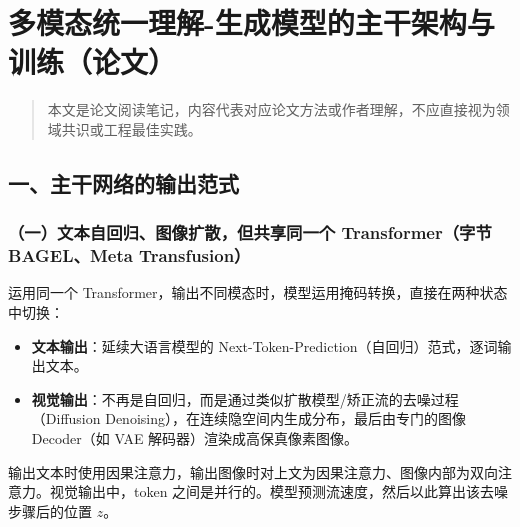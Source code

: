 \clearpage

\hypertarget{ux591aux6a21ux6001ux7edfux4e00ux7406ux89e3-ux751fux6210ux6a21ux578bux7684ux4e3bux5e72ux67b6ux6784ux4e0eux8badux7ec3ux8bbaux6587}{%
\section{多模态统一理解-生成模型的主干架构与训练（论文）}\label{ux591aux6a21ux6001ux7edfux4e00ux7406ux89e3-ux751fux6210ux6a21ux578bux7684ux4e3bux5e72ux67b6ux6784ux4e0eux8badux7ec3ux8bbaux6587}}

\begin{quote}
本文是论文阅读笔记，内容代表对应论文方法或作者理解，不应直接视为领域共识或工程最佳实践。
\end{quote}

\hypertarget{ux4e00ux4e3bux5e72ux7f51ux7edcux7684ux8f93ux51faux8303ux5f0f}{%
\subsection{一、主干网络的输出范式}\label{ux4e00ux4e3bux5e72ux7f51ux7edcux7684ux8f93ux51faux8303ux5f0f}}

\hypertarget{ux4e00ux6587ux672cux81eaux56deux5f52ux56feux50cfux6269ux6563ux4f46ux5171ux4eabux540cux4e00ux4e2a-transformerux5b57ux8282-bagelmeta-transfusion}{%
\subsubsection{（一）文本自回归、图像扩散，但共享同一个 Transformer（字节 BAGEL、Meta Transfusion）}\label{ux4e00ux6587ux672cux81eaux56deux5f52ux56feux50cfux6269ux6563ux4f46ux5171ux4eabux540cux4e00ux4e2a-transformerux5b57ux8282-bagelmeta-transfusion}}

运用同一个 Transformer，输出不同模态时，模型运用掩码转换，直接在两种状态中切换：

\begin{itemize}
\tightlist
\item
  \textbf{文本输出}：延续大语言模型的 Next-Token-Prediction（自回归）范式，逐词输出文本。
\item
  \textbf{视觉输出}：不再是自回归，而是通过类似扩散模型/矫正流的去噪过程（Diffusion Denoising），在连续隐空间内生成分布，最后由专门的图像 Decoder（如 VAE 解码器）渲染成高保真像素图像。
\end{itemize}

输出文本时使用因果注意力，输出图像时对上文为因果注意力、图像内部为双向注意力。视觉输出中，token 之间是并行的。模型预测流速度，然后以此算出该去噪步骤后的位置 \(z\)。

